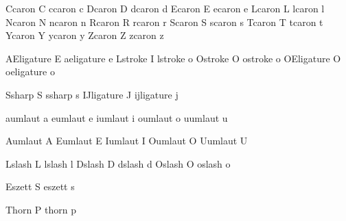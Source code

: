   \inheritprotrudefactor Ccaron C
  \inheritprotrudefactor ccaron c
  \inheritprotrudefactor Dcaron D
  \inheritprotrudefactor dcaron d
  \inheritprotrudefactor Ecaron E
  \inheritprotrudefactor ecaron e
  \inheritprotrudefactor Lcaron L
  \inheritprotrudefactor lcaron l
  \inheritprotrudefactor Ncaron N
  \inheritprotrudefactor ncaron n
  \inheritprotrudefactor Rcaron R
  \inheritprotrudefactor rcaron r
  \inheritprotrudefactor Scaron S
  \inheritprotrudefactor scaron s
  \inheritprotrudefactor Tcaron T
  \inheritprotrudefactor tcaron t
  \inheritprotrudefactor Ycaron Y
  \inheritprotrudefactor ycaron y
  \inheritprotrudefactor Zcaron Z
  \inheritprotrudefactor zcaron z
  
  \inheritprotrudefactor AEligature E
  \inheritprotrudefactor aeligature e
  \inheritprotrudefactor Lstroke    I
  \inheritprotrudefactor lstroke    o
  \inheritprotrudefactor Ostroke    O
  \inheritprotrudefactor ostroke    o
  \inheritprotrudefactor OEligature O
  \inheritprotrudefactor oeligature o
  
  \inheritprotrudefactor Ssharp     S
  \inheritprotrudefactor ssharp     s
  \inheritprotrudefactor IJligature J
  \inheritprotrudefactor ijligature j
  
  \inheritprotrudefactor aumlaut a
  \inheritprotrudefactor eumlaut e
  \inheritprotrudefactor iumlaut i
  \inheritprotrudefactor oumlaut o
  \inheritprotrudefactor uumlaut u
  
  \inheritprotrudefactor Aumlaut A
  \inheritprotrudefactor Eumlaut E
  \inheritprotrudefactor Iumlaut I
  \inheritprotrudefactor Oumlaut O
  \inheritprotrudefactor Uumlaut U
  
  \inheritprotrudefactor Lslash L 
  \inheritprotrudefactor lslash l
  \inheritprotrudefactor Dslash D
  \inheritprotrudefactor dslash d 
  \inheritprotrudefactor Oslash O 
  \inheritprotrudefactor oslash o 
  
  \inheritprotrudefactor Eszett S 
  \inheritprotrudefactor eszett s 
  
  \inheritprotrudefactor Thorn P
  \inheritprotrudefactor thorn p

\stopfonthandling

\unprotect 




\protect \endinput 
